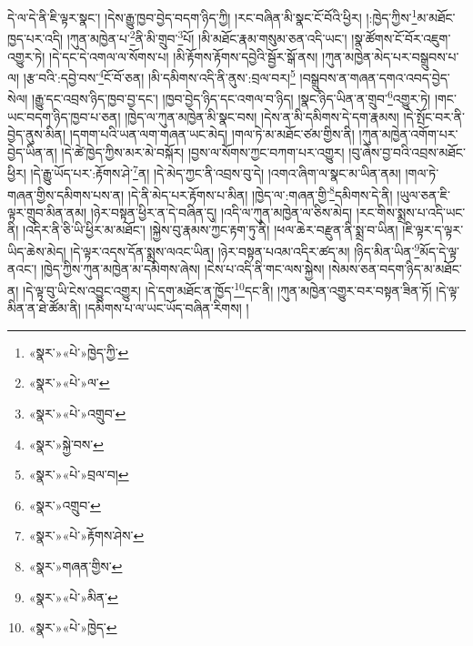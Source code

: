 དེ་ལ་དེ་ནི་ཇི་ལྟར་སྣང་། །དེས་རྒྱུ་ཁྱབ་བྱེད་བདག་ཉིད་ཀྱི། །རང་བཞིན་མི་སྣང་ངོ་བོའི་ཕྱིར། །:ཁྱེད་ཀྱིས་\footnote{«སྣར་»«པེ་»ཁྱེད་ཀྱི་}མ་མཐོང་ཁྱད་པར་འདི། །ཀུན་མཁྱེན་པ་\footnote{«སྣར་»«པེ་»ལ་}ནི་མི་གྲུབ་\footnote{«སྣར་»«པེ་»འགྲུབ་}པོ། །མི་མཐོང་རྣམ་གསུམ་ཅན་འདི་ཡང་། །སྣ་ཚོགས་ངོ་བོར་འཇུག་འགྱུར་ཏེ། །དེ་དང་དེ་འགལ་ལ་སོགས་པ། །མི་རྟོགས་རྟོགས་དབྱེའི་སྦྱོར་སྒོ་ནས། །ཀུན་མཁྱེན་མེད་པར་བསྒྲུབས་པ་ལ། །རྩ་བའི་:དབྱེ་བས་\footnote{«སྣར་»སྐྱེ་བས་}ངོ་བོ་ཅན། །མི་དམིགས་འདི་ནི་ནུས་:བྲལ་བར།\footnote{«སྣར་»«པེ་»བྲལ་བ།} །བསྒྲུབས་ན་གཞན་དགའ་འབད་བྱེད་སེལ། །རྒྱུ་དང་འབྲས་ཉིད་ཁྱབ་བྱ་དང་། །ཁྱབ་བྱེད་ཉིད་དང་འགལ་བ་ཉིད། །སྣང་ཉིད་ཡིན་ན་གྲུབ་\footnote{«སྣར་»འགྲུབ་}འགྱུར་ཏེ། །གང་ཡང་བདག་ཉིད་ཁྱབ་པ་ཅན། །ཁྱེད་ལ་ཀུན་མཁྱེན་མི་སྣང་བས། །དེས་ན་མི་དམིགས་དེ་དག་རྣམས། །དེ་སྤོང་བར་ནི་བྱེད་ནུས་མིན། །དགག་པའི་ཡན་ལག་གཞན་ཡང་མེད། །གལ་ཏེ་མ་མཐོང་ཙམ་གྱིས་ནི། །ཀུན་མཁྱེན་འགོག་པར་བྱེད་ཡིན་ན། །དེ་ཚེ་ཁྱེད་ཀྱིས་མར་མེ་བསྐོར། །བྱས་ལ་སོགས་ཀྱང་བཀག་པར་འགྱུར། །བུ་ཞེས་བྱ་བའི་འབྲས་མཐོང་ཕྱིར། །དེ་རྒྱུ་ཡོད་པར་:རྟོགས་ཤེ་\footnote{«སྣར་»«པེ་»རྟོགས་ཤེས་}ན། །དེ་མེད་ཀྱང་ནི་འབྲས་བུ་དེ། །འགའ་ཞིག་ལ་སྣང་མ་ཡིན་ནམ། །གལ་ཏེ་གཞན་གྱིས་དམིགས་པས་ན། །དེ་ནི་མེད་པར་རྟོགས་པ་མིན། །ཁྱེད་ལ་:གཞན་གྱི་\footnote{«སྣར་»གཞན་གྱིས་}དམིགས་དེ་ནི། །ཡུལ་ཅན་ཇི་ལྟར་གྲུབ་མིན་ནམ། །ཉེར་བསྟན་ཕྱིར་ན་དེ་བཞིན་དུ། །འདི་ལ་ཀུན་མཁྱེན་ལ་ཅིས་མེད། །རང་གིས་སྨྲས་པ་འདི་ཡང་ནི། །འདིར་ནི་ཅི་ཡི་ཕྱིར་མ་མཐོང་། །སྐྱེས་བུ་རྣམས་ཀྱང་རྟག་ཏུ་ནི། །ཕལ་ཆེར་བརྫུན་ནི་སྨྲ་བ་ཡིན། །ཇི་ལྟར་ད་ལྟར་ཡིད་ཆེས་མེད། །དེ་ལྟར་འདས་དོན་སྨྲས་ལའང་ཡིན། །ཉེར་བསྟན་པའམ་འདིར་ཚད་མ། །ཉིད་མིན་ཡིན་\footnote{«སྣར་»«པེ་»མིན་}མོད་དེ་ལྟ་ནའང་། །ཁྱེད་ཀྱིས་ཀུན་མཁྱེན་མ་དམིགས་ཞེས། །ངེས་པ་འདི་ནི་གང་ལས་སྐྱེས། །སེམས་ཅན་བདག་ཉིད་མ་མཐོང་ན། །དེ་ལྟ་བུ་ཡི་ངེས་འབྱུང་འགྱུར། །དེ་དག་མཐོང་ན་ཁྱོད་\footnote{«སྣར་»«པེ་»ཁྱེད་}དང་ནི། །ཀུན་མཁྱེན་འགྱུར་བར་བསྟན་ཟིན་ཏོ། །དེ་ལྟ་མིན་ན་ཐེ་ཚོམ་ནི། །དམིགས་པ་ལ་ཡང་ཡོད་བཞིན་རིགས། །
